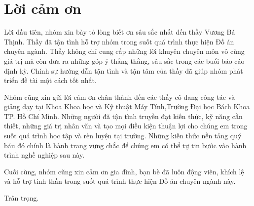 \section*{Lời cảm ơn}
\thispagestyle{empty}

Lời đầu tiên, nhóm xin bày tỏ lòng biết ơn sâu sắc nhất đến thầy Vương Bá Thịnh. Thầy đã tận tình hỗ trợ nhóm trong suốt quá trình thực hiện Đồ án chuyên ngành. Thầy không chỉ cung cấp những lời khuyên chuyên môn vô cùng giá trị mà còn đưa ra những góp ý thẳng thắng, sâu sắc trong các buổi báo cáo định kỳ. Chính sự hướng dẫn tận tình và tận tâm của thầy đã giúp nhóm phát triển đề tài một cách tốt nhất.

 Nhóm cũng xin gửi lời cảm ơn chân thành đến các thầy cô đang công tác và giảng dạy tại Khoa Khoa học và Kỹ thuật Máy Tính,Trường Đại học Bách Khoa TP. Hồ Chí Minh. Những người đã tận tình truyền đạt kiến thức, kỹ năng cần thiết, những giá trị nhân văn và tạo mọi điều kiện thuận lợi cho chúng em trong suốt quá trình học tập và rèn luyện tại trường. Những kiến thức nền tảng quý báu đó chính là hành trang vững chắc để chúng em có thể tự tin bước vào hành trình nghề nghiệp sau này.

Cuối cùng, nhóm cũng xin cảm ơn gia đình, bạn bè đã luôn động viên, khích lệ và hỗ trợ tinh thần trong suốt quá trình thực hiện Đồ án chuyên ngành này.

Trân trọng.

\clearpage
{}
